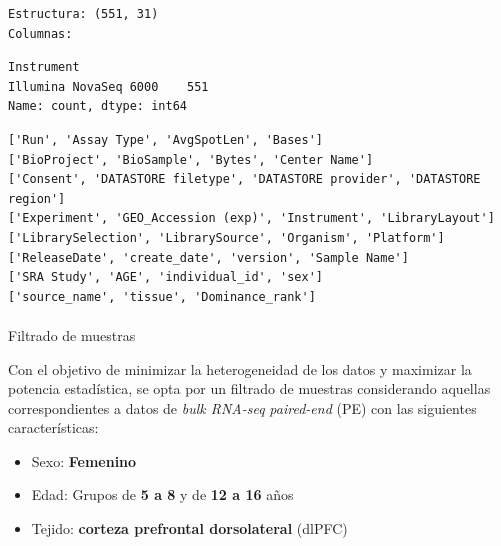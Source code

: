 \documentclass[
  12pt,
  letterpaper,
  DIV=11,
  numbers=noendperiod]{scrartcl}
\makeatletter
\let\oldparagraph\paragraph
\renewcommand{\paragraph}{
    \@ifstar
      \xxxParagraphStar
      \xxxParagraphNoStar
  }
\newcommand{\xxxParagraphStar}[1]{\oldparagraph*{#1}\mbox{}}
\newcommand{\xxxParagraphNoStar}[1]{\oldparagraph{#1}\mbox{}}
\providecommand{\tightlist}{%
  \setlength{\itemsep}{0pt}\setlength{\parskip}{0pt}}
\makeatother
\begin{document}
\begin{verbatim}
Estructura: (551, 31)
Columnas:
\end{verbatim}

\begin{verbatim}
Instrument
Illumina NovaSeq 6000    551
Name: count, dtype: int64
\end{verbatim}

\begin{verbatim}
['Run', 'Assay Type', 'AvgSpotLen', 'Bases']
['BioProject', 'BioSample', 'Bytes', 'Center Name']
['Consent', 'DATASTORE filetype', 'DATASTORE provider', 'DATASTORE region']
['Experiment', 'GEO_Accession (exp)', 'Instrument', 'LibraryLayout']
['LibrarySelection', 'LibrarySource', 'Organism', 'Platform']
['ReleaseDate', 'create_date', 'version', 'Sample Name']
['SRA Study', 'AGE', 'individual_id', 'sex']
['source_name', 'tissue', 'Dominance_rank']
\end{verbatim}

\paragraph{Filtrado de muestras}\label{filtrado-de-muestras}

Con el objetivo de minimizar la heterogeneidad de los datos y maximizar
la potencia estadística, se opta por un filtrado de muestras
considerando aquellas correspondientes a datos de \emph{bulk RNA-seq}
\emph{paired-end} (PE) con las siguientes características:

\begin{itemize}
\tightlist
\item
  Sexo: \textbf{Femenino}
\item
  Edad: Grupos de \textbf{5 a 8} y de \textbf{12 a 16} años
\item
  Tejido: \textbf{corteza prefrontal dorsolateral} (dlPFC)
\end{itemize}
\end{document}
